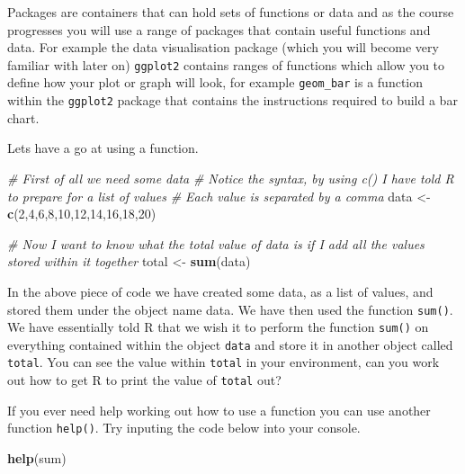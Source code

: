 \documentclass[
]{book}
\newenvironment{Shaded}{\begin{snugshade}}{\end{snugshade}}
\newcommand{\CommentTok}[1]{\textcolor[rgb]{0.56,0.35,0.01}{\textit{#1}}}
\newcommand{\DecValTok}[1]{\textcolor[rgb]{0.00,0.00,0.81}{#1}}
\newcommand{\FunctionTok}[1]{\textcolor[rgb]{0.13,0.29,0.53}{\textbf{#1}}}
\newcommand{\NormalTok}[1]{#1}
\newcommand{\OtherTok}[1]{\textcolor[rgb]{0.56,0.35,0.01}{#1}}
\begin{document}
Packages are containers that can hold sets of functions or data and as the course progresses you will use a range of packages that contain useful functions and data. For example the data visualisation package (which you will become very familiar with later on) \texttt{ggplot2} contains ranges of functions which allow you to define how your plot or graph will look, for example \texttt{geom\_bar} is a function within the \texttt{ggplot2} package that contains the instructions required to build a bar chart.

Lets have a go at using a function.

\begin{Shaded}
\begin{Highlighting}[]
\CommentTok{\# First of all we need some data}
\CommentTok{\# Notice the syntax, by using c() I have told R to prepare for a list of values}
\CommentTok{\# Each value is separated by a comma}
\NormalTok{data }\OtherTok{\textless{}{-}} \FunctionTok{c}\NormalTok{(}\DecValTok{2}\NormalTok{,}\DecValTok{4}\NormalTok{,}\DecValTok{6}\NormalTok{,}\DecValTok{8}\NormalTok{,}\DecValTok{10}\NormalTok{,}\DecValTok{12}\NormalTok{,}\DecValTok{14}\NormalTok{,}\DecValTok{16}\NormalTok{,}\DecValTok{18}\NormalTok{,}\DecValTok{20}\NormalTok{)}

\CommentTok{\# Now I want to know what the total value of data is if I add all the values stored within it together}
\NormalTok{total }\OtherTok{\textless{}{-}} \FunctionTok{sum}\NormalTok{(data)}
\end{Highlighting}
\end{Shaded}

In the above piece of code we have created some data, as a list of values, and stored them under the object name data. We have then used the function \texttt{sum()}. We have essentially told R that we wish it to perform the function \texttt{sum()} on everything contained within the object \texttt{data} and store it in another object called \texttt{total}. You can see the value within \texttt{total} in your environment, can you work out how to get R to print the value of \texttt{total} out?

If you ever need help working out how to use a function you can use another function \texttt{help()}. Try inputing the code below into your console.

\begin{Shaded}
\begin{Highlighting}[]
\FunctionTok{help}\NormalTok{(sum)}
\end{Highlighting}
\end{Shaded}
\end{document}

